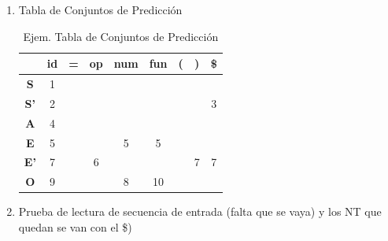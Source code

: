 \documentclass[12pt, twoside, openright]{report} %
\begin{document}
\begin{enumerate}
\item
  Tabla de Conjuntos de Predicción

\begin{table}[H]
  \centering
  \begin{tabular}{c|c|c|c|c|c|c|c|c|}
              & \textbf{id} & \textbf{=} & \textbf{op} & \textbf{num} & \textbf{fun} & \textbf{(} & \textbf{)} & \textbf{\$} \\ \hline
  \textbf{S}  & 1           &            &             &              &              &            &            &             \\ \hline
  \textbf{S'} & 2           &            &             &              &              &            &            & 3           \\ \hline
  \textbf{A}  & 4           &            &             &              &              &            &            &             \\ \hline
  \textbf{E}  & 5           &            &             & 5            & 5            &            &            &             \\ \hline
  \textbf{E'} & 7           &            & 6           &              &              &            & 7          & 7           \\ \hline
  \textbf{O}  & 9           &            &             & 8            & 10           &            &            &             \\ \hline
  \end{tabular}
  \caption{Ejem. Tabla de Conjuntos de Predicción}
  \end{table}
\pagebreak
\item
  Prueba de lectura de secuencia de entrada (falta que se vaya) y los
  NT que quedan se van con el \$)


\end{enumerate}
\end{document}
